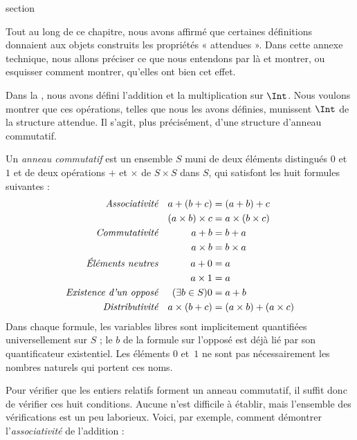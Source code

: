 \documentclass[11pt,a4paper,openany]{memoir}
\begin{document}
\begingroup
\expandafter\def\csname ol@sectioncs\endcsname{section}
\def\olfilename{checking-details}



Tout au long de ce chapitre, nous avons affirmé que certaines définitions
donnaient aux objets construits les propriétés « attendues ». Dans cette
annexe technique, nous allons préciser ce que nous entendons par là et
montrer, ou esquisser comment montrer, qu'elles ont bien cet effet.

Dans la , nous avons défini l'addition et la multiplication
sur $\Int$. Nous voulons montrer que ces opérations, telles que nous
les avons définies, munissent $\Int$ de la structure attendue.
Il s'agit, plus précisément, d'une structure d'anneau commutatif.

\begin{defn}
Un \emph{anneau commutatif} est un ensemble $S$ muni de deux éléments
distingués $0$ et $1$ et de deux opérations $+$ et $\times$ de
$S\times S$ dans $S$, qui satisfont les huit formules suivantes :
\begin{align*}
  \emph{Associativité}&&a + (b+ c) & = (a + b) + c \\
  && (a \times b) \times c & = a \times (b\times c)\\
  \emph{Commutativité}&&a + b &= b+ a  \\
  && a \times b&= b\times a\\
  \emph{Éléments neutres}&&a + 0 &= a \\
  && a \times 1 &= a\\
  \emph{Existence d'un opposé}&&(\exists b\in S)0&=a + b\\
  \emph{Distributivité}&&a \times (b+ c ) &= (a \times b) + (a \times c)
\end{align*}
Dans chaque formule, les variables libres sont implicitement quantifiées
universellement sur $S$ ; le $b$ de la formule sur l'opposé est déjà lié
par son quantificateur existentiel. Les éléments $0$ et~$1$ ne sont pas
nécessairement les nombres naturels qui portent ces noms.
\end{defn}

Pour vérifier que les entiers relatifs forment un anneau commutatif, il
suffit donc de vérifier ces huit conditions. Aucune n'est difficile à
établir, mais l'ensemble des vérifications est un peu laborieux. Voici,
par exemple, comment démontrer l'\emph{associativité} de l'addition :
\end{document}

